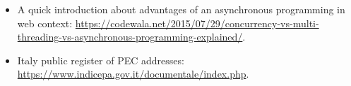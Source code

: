 \begin{itemize}
	\item A quick introduction about advantages of an asynchronous programming in web context: \url{https://codewala.net/2015/07/29/concurrency-vs-multi-threading-vs-asynchronous-programming-explained/}.
	\item Italy public register of PEC addresses: \url{https://www.indicepa.gov.it/documentale/index.php}.
\end{itemize}